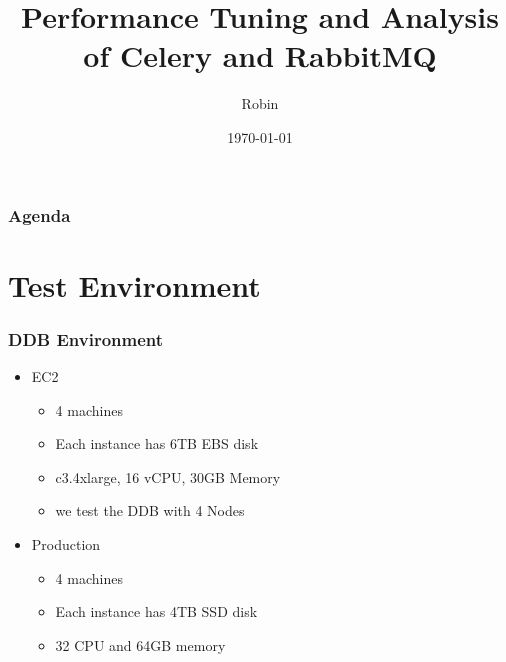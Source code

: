 \documentclass{beamer}
\title[DDB with Celery and RabbitMQ]{Performance Tuning and Analysis of Celery  and RabbitMQ} %
\author{Robin} %
\date{\today} %
\begin{document}
\begin{frame}
\titlepage %
\end{frame}

\begin{frame}
\frametitle{Agenda} %
\tableofcontents %
\end{frame}


\section{Test Environment} %


\begin{frame}
\frametitle{DDB Environment}
\begin{itemize}
\item EC2
	\begin{itemize}
	\item 4 machines
	\item Each instance has 6TB EBS disk
	\item c3.4xlarge, 16 vCPU, 30GB Memory
	\item we test the DDB with 4 Nodes
	\end{itemize}
\item Production
	\begin{itemize}
	\item 4 machines
	\item Each instance has 4TB SSD disk
	\item 32 CPU and 64GB memory
	\end{itemize}	
\end{itemize}
\end{frame}
\end{document}
